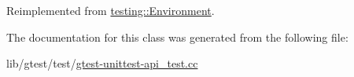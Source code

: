 Reimplemented from \hyperlink{classtesting_1_1_environment_a039bdaa705c46b9b88234cf4d3bb6254}{testing\-::\-Environment}.



The documentation for this class was generated from the following file\-:\begin{DoxyCompactItemize}
\item 
lib/gtest/test/\hyperlink{gtest-unittest-api__test_8cc}{gtest-\/unittest-\/api\-\_\-test.\-cc}\end{DoxyCompactItemize}
